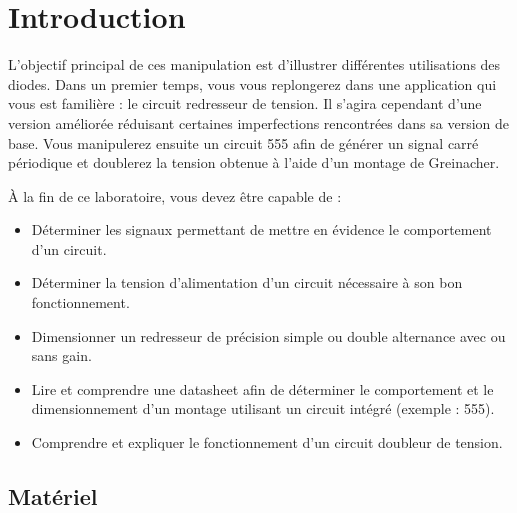 \documentclass{../template/labo}
\author{GEI}
\begin{document}

\section{Introduction}
L'objectif principal de ces manipulation est d'illustrer différentes utilisations des diodes.
Dans un premier temps, vous vous replongerez dans une application qui vous est familière : le circuit redresseur de tension. Il s'agira cependant d'une version améliorée réduisant certaines imperfections rencontrées dans sa version de base.
Vous manipulerez ensuite un circuit 555 afin de générer un signal carré périodique et doublerez la tension obtenue à l'aide d'un montage de Greinacher.


À la fin de ce laboratoire, vous devez être capable de :
\begin{itemize}
\item Déterminer les signaux permettant de mettre en évidence le comportement d'un circuit.
\item Déterminer la tension d'alimentation d'un circuit nécessaire à son bon fonctionnement.
\item Dimensionner un redresseur de précision simple ou double alternance avec ou sans gain.
\item Lire et comprendre une datasheet afin de déterminer le comportement et le dimensionnement d'un montage utilisant un circuit intégré (exemple : 555).
\item Comprendre et expliquer le fonctionnement d'un circuit doubleur de tension.
\end{itemize}

\subsection{Matériel}
\end{document}
